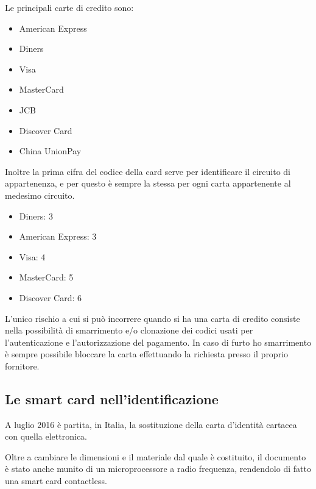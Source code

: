 Le principali carte di credito sono:
\begin{itemize}
    \item American Express
    \item Diners
    \item Visa
    \item MasterCard
    \item JCB
    \item Discover Card
    \item China UnionPay
\end{itemize}

Inoltre la prima cifra del codice della card serve per identificare il circuito di appartenenza, e per questo è sempre la stessa per ogni carta appartenente al medesimo circuito.
\begin{itemize}
    \item Diners: 3
    \item American Express: 3
    \item Visa: 4
    \item MasterCard: 5
    \item Discover Card: 6
\end{itemize}

L'unico rischio a cui si può incorrere quando si ha una carta di credito consiste nella possibilità di smarrimento e/o clonazione dei codici usati per l'autenticazione e l'autorizzazione del pagamento. In caso di furto ho smarrimento è sempre possibile bloccare la carta effettuando la richiesta presso il proprio fornitore.
\cite{Wiki_cc}

\subsection{Le smart card nell'identificazione}
A luglio 2016 è partita, in Italia, la sostituzione della carta d'identità cartacea con quella elettronica.

Oltre a cambiare le dimensioni e il materiale dal quale è costituito, il documento è stato anche munito di un microprocessore a radio frequenza, rendendolo di fatto una smart card contactless.

